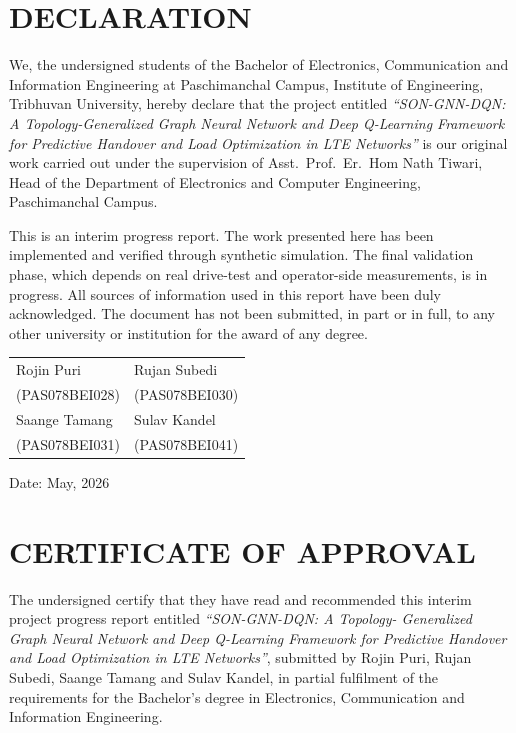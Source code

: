 \documentclass[12pt,a4paper,oneside]{report}
\begin{document}
\chapter*{DECLARATION}

We, the undersigned students of the Bachelor of Electronics, Communication
and Information Engineering at Paschimanchal Campus, Institute of
Engineering, Tribhuvan University, hereby declare that the project entitled
\textit{``SON-GNN-DQN: A Topology-Generalized Graph Neural Network and Deep
Q-Learning Framework for Predictive Handover and Load Optimization in LTE
Networks''} is our original work carried out under the supervision of
Asst.\ Prof.\ Er.\ Hom Nath Tiwari, Head of the Department of Electronics
and Computer Engineering, Paschimanchal Campus.

This is an interim progress report. The work presented here has been
implemented and verified through synthetic simulation. The final
validation phase, which depends on real drive-test and operator-side
measurements, is in progress. All sources of information used in this
report have been duly acknowledged. The document has not been submitted,
in part or in full, to any other university or institution for the award
of any degree.

\vspace{1.5cm}

\begin{tabular}{p{6cm}p{6cm}}
Rojin Puri \dotfill   & Rujan Subedi \dotfill \\[1.0cm]
(PAS078BEI028)        & (PAS078BEI030) \\[1.5cm]
Saange Tamang \dotfill & Sulav Kandel \dotfill \\[1.0cm]
(PAS078BEI031)        & (PAS078BEI041) \\
\end{tabular}

\vspace{1cm}
\noindent Date: May, 2026

\chapter*{CERTIFICATE OF APPROVAL}

The undersigned certify that they have read and recommended this interim
project progress report entitled \textit{``SON-GNN-DQN: A Topology-
Generalized Graph Neural Network and Deep Q-Learning Framework for
Predictive Handover and Load Optimization in LTE Networks''}, submitted by
Rojin Puri, Rujan Subedi, Saange Tamang and Sulav Kandel, in partial
fulfilment of the requirements for the Bachelor's degree in Electronics,
Communication and Information Engineering.
\end{document}
